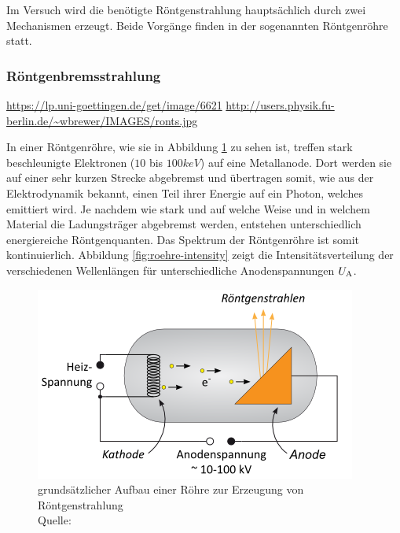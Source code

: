 		Im Versuch wird die benötigte Röntgenstrahlung hauptsächlich durch zwei Mechanismen erzeugt.
		Beide Vorgänge finden in der sogenannten Röntgenröhre statt.

		\subsubsection{Röntgenbremsstrahlung} %
		\label{ssub:rntgenbremsstrahlung}

			\url{https://lp.uni-goettingen.de/get/image/6621}
			\url{http://users.physik.fu-berlin.de/~wbrewer/IMAGES/ronts.jpg}

			In einer Röntgenröhre, wie sie in Abbildung \ref{fig:roehre-scheme} zu sehen ist, treffen stark beschleunigte Elektronen ($10$ bis $100 \unit{keV} $) auf eine Metallanode.
			Dort werden sie auf einer sehr kurzen Strecke abgebremst und übertragen somit, wie aus der Elektrodynamik bekannt, einen Teil ihrer Energie auf ein Photon, welches emittiert wird.
			Je nachdem wie stark und auf welche Weise und in welchem Material die Ladungsträger abgebremst werden, entstehen unterschiedlich energiereiche Röntgenquanten.
			Das Spektrum der Röntgenröhre ist somit kontinuierlich.
			Abbildung \ref{fig:roehre-intensity} zeigt die Intensitätsverteilung der verschiedenen Wellenlängen für unterschiedliche Anodenspannungen $U_{\mathrm{A}}$.
			
			\begin{figure}[htb]
				\centering
				\includegraphics[scale = 1]{images/roehre-schema.png}
				\caption{grundsätzlicher Aufbau einer Röhre zur Erzeugung von Röntgenstrahlung \\ Quelle: }
				\label{fig:roehre-scheme}
			\end{figure}
			

